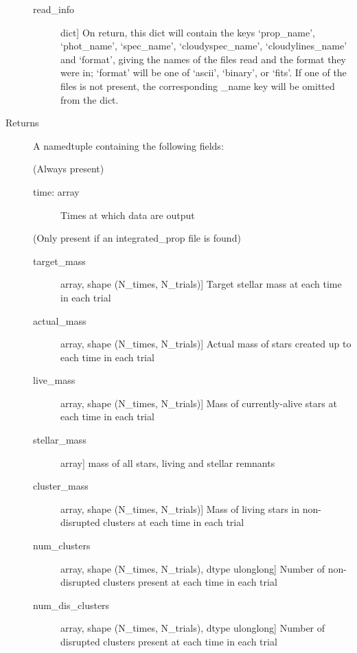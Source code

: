 \documentclass[letterpaper,10pt,english]{sphinxmanual}
\begin{document}
\begin{fulllineitems}
\begin{description}
\begin{description}
\item[{read\_info}] \leavevmode{[}dict{]}
On return, this dict will contain the keys `prop\_name',
`phot\_name', `spec\_name', `cloudyspec\_name', `cloudylines\_name'
and `format', giving the names of the files read and the format
they were in; `format' will be one of `ascii', `binary', or
`fits'. If one of the files is not present, the corresponding
\_name key will be omitted from the dict.

\end{description}

\item[{Returns}] \leavevmode
A namedtuple containing the following fields:

(Always present)
\begin{description}
\item[{time: array}] \leavevmode
Times at which data are output

\end{description}

(Only present if an integrated\_prop file is found)
\begin{description}
\item[{target\_mass}] \leavevmode{[}array, shape (N\_times, N\_trials){]}
Target stellar mass at each time in each trial

\item[{actual\_mass}] \leavevmode{[}array, shape (N\_times, N\_trials){]}
Actual mass of stars created up to each time in each trial

\item[{live\_mass}] \leavevmode{[}array, shape (N\_times, N\_trials){]}
Mass of currently-alive stars at each time in each trial

\item[{stellar\_mass}] \leavevmode{[}array{]}
mass of all stars, living and stellar remnants

\item[{cluster\_mass}] \leavevmode{[}array, shape (N\_times, N\_trials){]}
Mass of living stars in non-disrupted clusters at each time in
each trial

\item[{num\_clusters}] \leavevmode{[}array, shape (N\_times, N\_trials), dtype ulonglong{]}
Number of non-disrupted clusters present at each time in each
trial

\item[{num\_dis\_clusters}] \leavevmode{[}array, shape (N\_times, N\_trials), dtype ulonglong{]}
Number of disrupted clusters present at each time in each trial


\end{description}
\end{description}
\end{fulllineitems}
\end{document}
